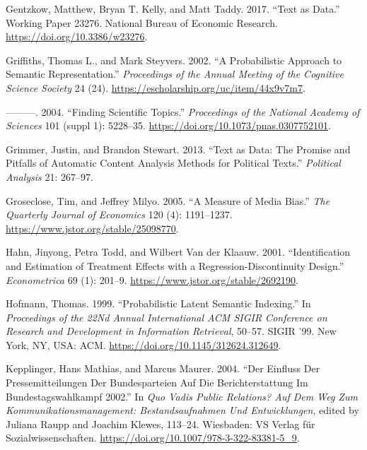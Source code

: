 \documentclass[
]{article}
\begin{document}
\leavevmode\hypertarget{ref-gentzkow_text_2017}{}%
Gentzkow, Matthew, Bryan T. Kelly, and Matt Taddy. 2017. ``Text as
Data.'' Working Paper 23276. National Bureau of Economic Research.
\url{https://doi.org/10.3386/w23276}.

\leavevmode\hypertarget{ref-griffiths_probabilistic_2002}{}%
Griffiths, Thomas L., and Mark Steyvers. 2002. ``A Probabilistic
Approach to Semantic Representation.'' \emph{Proceedings of the Annual
Meeting of the Cognitive Science Society} 24 (24).
\url{https://escholarship.org/uc/item/44x9v7m7}.

\leavevmode\hypertarget{ref-griffiths_finding_2004}{}%
---------. 2004. ``Finding Scientific Topics.'' \emph{Proceedings of the
National Academy of Sciences} 101 (suppl 1): 5228--35.
\url{https://doi.org/10.1073/pnas.0307752101}.

\leavevmode\hypertarget{ref-grimmer_text_2013}{}%
Grimmer, Justin, and Brandon Stewart. 2013. ``Text as Data: The Promise
and Pitfalls of Automatic Content Analysis Methods for Political
Texts.'' \emph{Political Analysis} 21: 267--97.

\leavevmode\hypertarget{ref-groseclose_measure_2005}{}%
Groseclose, Tim, and Jeffrey Milyo. 2005. ``A Measure of Media Bias.''
\emph{The Quarterly Journal of Economics} 120 (4): 1191--1237.
\url{https://www.jstor.org/stable/25098770}.

\leavevmode\hypertarget{ref-hahn_identification_2001}{}%
Hahn, Jinyong, Petra Todd, and Wilbert Van der Klaauw. 2001.
``Identification and Estimation of Treatment Effects with a
Regression-Discontinuity Design.'' \emph{Econometrica} 69 (1): 201--9.
\url{https://www.jstor.org/stable/2692190}.

\leavevmode\hypertarget{ref-hofmann_probabilistic_1999}{}%
Hofmann, Thomas. 1999. ``Probabilistic Latent Semantic Indexing.'' In
\emph{Proceedings of the 22Nd Annual International ACM SIGIR Conference
on Research and Development in Information Retrieval}, 50--57. SIGIR
'99. New York, NY, USA: ACM.
\url{https://doi.org/10.1145/312624.312649}.

\leavevmode\hypertarget{ref-kepplinger_einfluss_2004}{}%
Kepplinger, Hans Mathias, and Marcus Maurer. 2004. ``Der Einfluss Der
Pressemitteilungen Der Bundesparteien Auf Die Berichterstattung Im
Bundestagswahlkampf 2002.'' In \emph{Quo Vadis Public Relations? Auf Dem
Weg Zum Kommunikationsmanagement: Bestandsaufnahmen Und Entwicklungen},
edited by Juliana Raupp and Joachim Klewes, 113--24. Wiesbaden: VS
Verlag für Sozialwissenschaften.
\url{https://doi.org/10.1007/978-3-322-83381-5_9}.
\end{document}
